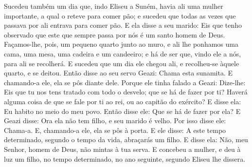 Sucedeu também um dia que, indo Eliseu a Suném, havia ali uma
mulher importante, a qual o reteve para comer pão; e sucedeu que
todas as vezes que passava por ali entrava para comer pão. E ela
disse a seu marido: Eis que tenho observado que este que sempre
passa por nós é um santo homem de Deus. Façamos-lhe, pois, um
pequeno quarto junto ao muro, e ali lhe ponhamos uma cama, uma mesa,
uma cadeira e um candeeiro; e há de ser que, vindo ele a nós, para
ali se recolherá. E sucedeu que um dia ele chegou ali, e
recolheu-se àquele quarto, e se deitou. Então disse ao seu
servo Geazi: Chama esta sunamita. E chamando-a ele, ela se pôs
diante dele. Porque ele tinha falado a Geazi: Dize-lhe: Eis
que tu nos tens tratado com todo o desvelo; que se há de fazer por
ti? Haverá alguma coisa de que se fale por ti ao rei, ou ao capitão
do exército? E disse ela: Eu habito no meio do meu povo.
Então disse ele: Que se há de fazer por ela? E Geazi disse:
Ora ela não tem filho, e seu marido é velho. Por isso disse
ele: Chama-a. E, chamando-a ele, ela se pôs à porta. E ele
disse: A este tempo determinado, segundo o tempo da vida, abraçarás
um filho. E disse ela: Não, meu Senhor, homem de Deus, não mintas à
tua serva. E concebeu a mulher, e deu à luz um filho, no
tempo determinado, no ano seguinte, segundo Eliseu lhe dissera.


